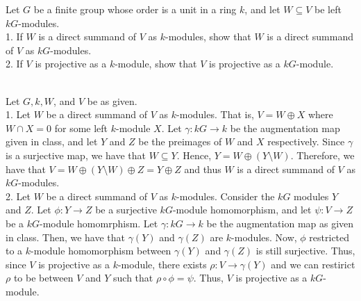Let $G$ be a finite group whose order is a unit in a ring $k$, and let $W\subseteq V$ be left
$kG$-modules.\\
1. If $W$ is a direct summand of $V$ as $k$-modules, show that $W$ is a direct summand of $V$ as
$kG$-modules.\\
2. If $V$ is projective as a $k$-module, show that $V$ is projective as a $kG$-module.\\

\begin{solution}\renewcommand{\qedsymbol}{}\ \\
    Let $G, k, W$, and $V$ be as given.\\
    1. Let $W$ be a direct summand of $V$ as $k$-modules. That is, $V=W\oplus X$ where $W\cap X=0$ for
    some left $k$-module $X$. Let $\gamma:kG\rightarrow k$ be the augmentation map given in class, and
    let $Y$ and $Z$ be the preimages of $W$ and $X$ respectively. Since $\gamma$ is a surjective map, we
    have that $W\subseteq Y$. Hence, $Y=W\oplus (Y\setminus W)$. Therefore, we have that
    $V=W\oplus (Y\setminus W)\oplus Z=Y\oplus Z$ and thus $W$ is a direct summand of $V$ as
    $kG$-modules.\\

    2. Let $W$ be a direct summand of $V$ as $k$-modules. Consider the $kG$ modules $Y$ and $Z$. Let
    $\phi:Y\rightarrow Z$ be a surjective $kG$-module homomorphism, and let $\psi:V\rightarrow Z$ be a
    $kG$-module homomrphism. Let $\gamma:kG\rightarrow k$ be the augmentation map as given in class.
    Then, we have that $\gamma(Y)$ and $\gamma(Z)$ are $k$-modules. Now, $\phi$ restricted to a
    $k$-module homomorphism between $\gamma(Y)$ and $\gamma(Z)$ is still surjective. Thus, since $V$ is
    projective as a $k$-module, there exists $\rho:V\rightarrow\gamma(Y)$ and we can restirict $\rho$ to
    be between $V$ and $Y$ such that $\rho\circ\phi=\psi$. Thus, $V$ is projective as a $kG$-module.

\end{solution}